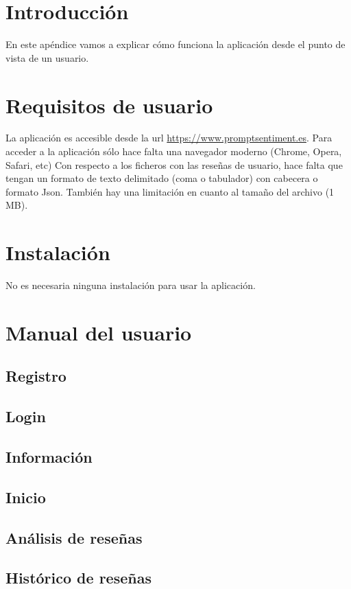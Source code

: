 
\section{Introducción}
En este apéndice vamos a explicar cómo funciona la aplicación desde el punto de vista de un usuario.

\section{Requisitos de usuario}
La aplicación es accesible desde la url \href{https://www.promptsentiment.es}{https://www.promptsentiment.es}.
Para acceder a la aplicación sólo hace falta una navegador moderno (Chrome, Opera, Safari, etc)
Con respecto a los ficheros con las reseñas de usuario, hace falta que tengan un formato 
de texto delimitado (coma o tabulador) con cabecera o formato Json.
También hay una limitación en cuanto al tamaño del archivo (1 MB).


\section{Instalación}
No es necesaria ninguna instalación para usar la aplicación.

\section{Manual del usuario}

\subsection{Registro}
\subsection{Login}
\subsection{Información}
\subsection{Inicio}
\subsection{Análisis de reseñas}
\subsection{Histórico de reseñas}


